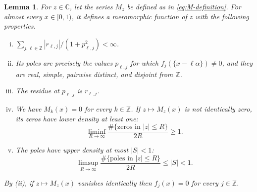 \documentclass[reqno,a4paper,12pt]{amsart}
\numberwithin{equation}{section}
\newtheorem{lemma}[definition]{Lemma}
\def\Z{{\mathbb Z}}
\def\C{{\mathbb C}}
\newcommand\1{\mathds{1}}
\begin{document}
\begin{lemma}\label{lem:M-meromorphic}
For $z\in\C$, let the series $M_z$ be defined as in \eqref{eq:M-definition}.
For almost every $x\in[0,1)$, it defines a meromorphic function of $z$
with the following properties.
\begin{enumerate}[(i)]
\item $\sum_{j,\ell\in\Z}|r_{\ell,j}|/(1+p_{\ell,j}^2)<\infty$.
\item Its poles are precisely the values $p_{\ell,j}$ for which
$f_j(\{x-\ell\alpha\})\ne0$, and they are real, simple, pairwise
distinct, and disjoint from $\Z$.
\item The residue at $p_{\ell,j}$ is $r_{\ell,j}$.

\item We have $M_k(x)=0$ for every $k\in\Z$. If
$z\mapsto M_z(x)$ is not identically zero, its zeros have lower
density at least one:
\begin{equation}\label{eq:M-integer-zeros}
 \liminf_{R\to\infty}
 \frac{\#\{\text{zeros in }|z|\leq R\}}{2R}\geq1.
\end{equation}
\item The poles have upper density at most $|S|<1$:
\begin{equation}\label{eq:M-pole-density}
 \limsup_{R\to\infty}
 \frac{\#\{\text{poles in }|z|\leq R\}}{2R}\leq|S|<1.
\end{equation}
\end{enumerate}
By (ii), if $z\mapsto M_z(x)$ vanishes identically then
$f_j(x)=0$ for every $j\in\Z$.
\end{lemma}
\end{document}
